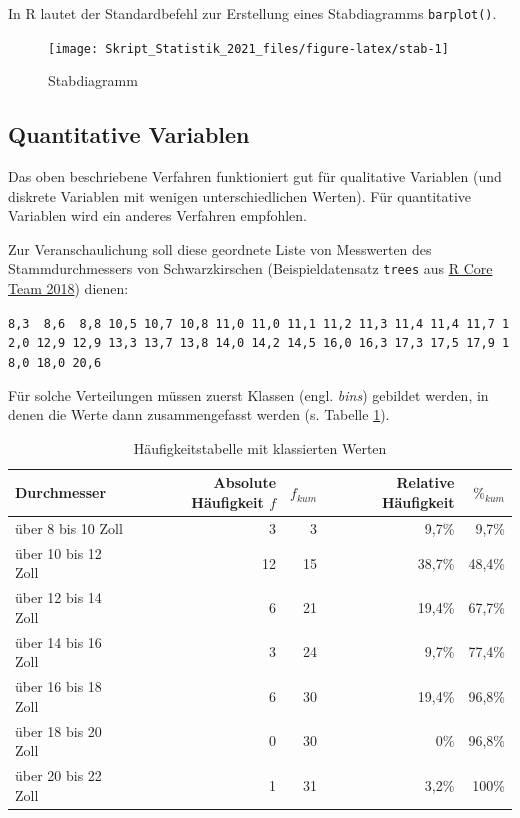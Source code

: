 \documentclass[
  11pt,
  ngerman,
  a4paper,
]{report}
\newenvironment{rtip}{
  \medskip
  \begin{tcolorbox}[colframe=purple,colback=light_gray,title=Softwarehinweis]
}{
  \end{tcolorbox}
  \medskip
}
\begin{document}
\begin{rtip}
In R lautet der Standardbefehl zur Erstellung eines Stabdiagramms \verb|barplot()|.
\end{rtip}

\begin{figure}[!h]

{\centering \texttt{[image: Skript\_Statistik\_2021\_files/figure-latex/stab-1]} 

}

\caption{Stabdiagramm}\label{fig:stab}
\end{figure}

\hypertarget{quantitative-variablen-1}{%
\subsection{Quantitative Variablen}\label{quantitative-variablen-1}}

Das oben beschriebene Verfahren funktioniert gut für qualitative Variablen (und diskrete Variablen mit wenigen unterschiedlichen Werten). Für quantitative Variablen wird ein anderes Verfahren empfohlen.

Zur Veranschaulichung soll diese geordnete Liste von Messwerten des Stammdurchmessers von Schwarzkirschen (Beispieldatensatz \texttt{trees} aus \protect\hyperlink{ref-r}{R Core Team 2018}) dienen:

\texttt{8,3\ \ 8,6\ \ 8,8\ 10,5\ 10,7\ 10,8\ 11,0\ 11,0\ 11,1\ 11,2\ 11,3\ 11,4\ 11,4\ 11,7\ 12,0\ 12,9\ 12,9\ 13,3\ 13,7\ 13,8\ 14,0\ 14,2\ 14,5\ 16,0\ 16,3\ 17,3\ 17,5\ 17,9\ 18,0\ 18,0\ 20,6}

Für solche Verteilungen müssen zuerst Klassen (engl. \emph{bins}) gebildet werden, in denen die Werte dann zusammengefasst werden (s. Tabelle \ref{tab:haeufklass}).

\begin{table}

\caption{\label{tab:haeufklass}Häufigkeitstabelle mit klassierten Werten}
\centering
\begin{tabular}[t]{lrrrr}
\toprule
Durchmesser & Absolute Häufigkeit $f$ & $f_{kum}$ & Relative Häufigkeit & $\%_{kum}$\\
\midrule
über 8 bis 10 Zoll & 3 & 3 & 9,7\% & 9,7\%\\
über 10 bis 12 Zoll & 12 & 15 & 38,7\% & 48,4\%\\
über 12 bis 14 Zoll & 6 & 21 & 19,4\% & 67,7\%\\
über 14 bis 16 Zoll & 3 & 24 & 9,7\% & 77,4\%\\
über 16 bis 18 Zoll & 6 & 30 & 19,4\% & 96,8\%\\
über 18 bis 20 Zoll & 0 & 30 & 0\% & 96,8\%\\
über 20 bis 22 Zoll & 1 & 31 & 3,2\% & 100\%\\
\bottomrule
\end{tabular}
\end{table}
\end{document}
